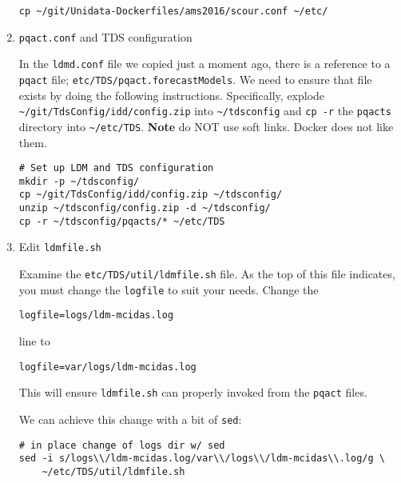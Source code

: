 \documentclass[onecolumn,9pt]{article}
\begin{document}
\begin{enumerate}
\begin{verbatim}
cp ~/git/Unidata-Dockerfiles/ams2016/scour.conf ~/etc/
\end{verbatim}

\item \texttt{pqact.conf} and TDS configuration
\label{sec:orgheadline22}

In the \texttt{ldmd.conf} file we copied just a moment ago, there is a reference to a \texttt{pqact} file; \texttt{etc/TDS/pqact.forecastModels}. We need to ensure that file exists by doing the following instructions. Specifically, explode \texttt{\textasciitilde{}/git/TdsConfig/idd/config.zip} into \texttt{\textasciitilde{}/tdsconfig} and \texttt{cp -r} the \texttt{pqacts} directory into \texttt{\textasciitilde{}/etc/TDS}. \textbf{Note} do NOT use soft links. Docker does not like them.

\begin{verbatim}
# Set up LDM and TDS configuration
mkdir -p ~/tdsconfig/
cp ~/git/TdsConfig/idd/config.zip ~/tdsconfig/
unzip ~/tdsconfig/config.zip -d ~/tdsconfig/
cp -r ~/tdsconfig/pqacts/* ~/etc/TDS
\end{verbatim}

\item \label{orgtarget7}Edit \texttt{ldmfile.sh}
\label{sec:orgheadline23}

Examine the \texttt{etc/TDS/util/ldmfile.sh} file. As the top of this file indicates, you must change the \texttt{logfile} to suit your needs. Change the 

\begin{verbatim}
logfile=logs/ldm-mcidas.log
\end{verbatim}

line to

\begin{verbatim}
logfile=var/logs/ldm-mcidas.log
\end{verbatim}

This will ensure \texttt{ldmfile.sh} can properly invoked from the \texttt{pqact} files.

We can achieve this change with a bit of \texttt{sed}:

\begin{verbatim}
# in place change of logs dir w/ sed
sed -i s/logs\\/ldm-mcidas.log/var\\/logs\\/ldm-mcidas\\.log/g \
    ~/etc/TDS/util/ldmfile.sh
\end{verbatim}
\end{enumerate}
\end{document}
